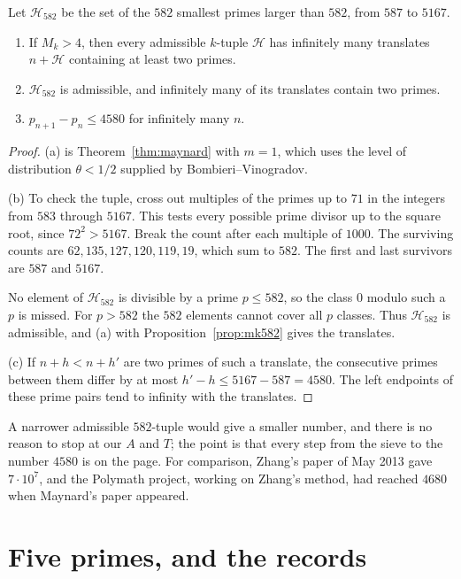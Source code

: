 \begin{theorem}\label{thm:explicitgap}
Let $\mathcal H_{582}$ be the set of the $582$ smallest primes larger than $582$, from $587$ to $5167$.
\begin{enumerate}[label=(\alph*)]
\item If $M_k>4$, then every admissible $k$-tuple $\mathcal H$ has infinitely many translates $n+\mathcal H$ containing at least two primes.
\item $\mathcal H_{582}$ is admissible, and infinitely many of its translates contain two primes.
\item $p_{n+1}-p_n\le4580$ for infinitely many $n$.
\end{enumerate}
\end{theorem}
\begin{proof}
(a) is Theorem~\ref{thm:maynard} with $m=1$, which uses the level of distribution $\theta<1/2$ supplied by Bombieri--Vinogradov.

(b) To check the tuple, cross out multiples of the primes up to $71$ in the integers from $583$ through $5167$. This tests every possible prime divisor up to the square root, since $72^2>5167$. Break the count after each multiple of $1000$. The surviving counts are $62,135,127,120,119,19$, which sum to $582$. The first and last survivors are $587$ and $5167$.

No element of $\mathcal H_{582}$ is divisible by a prime $p\le582$, so the class $0$ modulo such a $p$ is missed. For $p>582$ the $582$ elements cannot cover all $p$ classes. Thus $\mathcal H_{582}$ is admissible, and (a) with Proposition~\ref{prop:mk582} gives the translates.

(c) If $n+h<n+h'$ are two primes of such a translate, the consecutive primes between them differ by at most $h'-h\le5167-587=4580$. The left endpoints of these prime pairs tend to infinity with the translates.
\end{proof}

A narrower admissible $582$-tuple would give a smaller number, and there is no reason to stop at our $A$ and $T$; the point is that every step from the sieve to the number $4580$ is on the page. For comparison, Zhang's paper of May 2013 gave $7\cdot10^7$, and the Polymath project, working on Zhang's method, had reached $4680$ when Maynard's paper appeared.

\section{Five primes, and the records}

